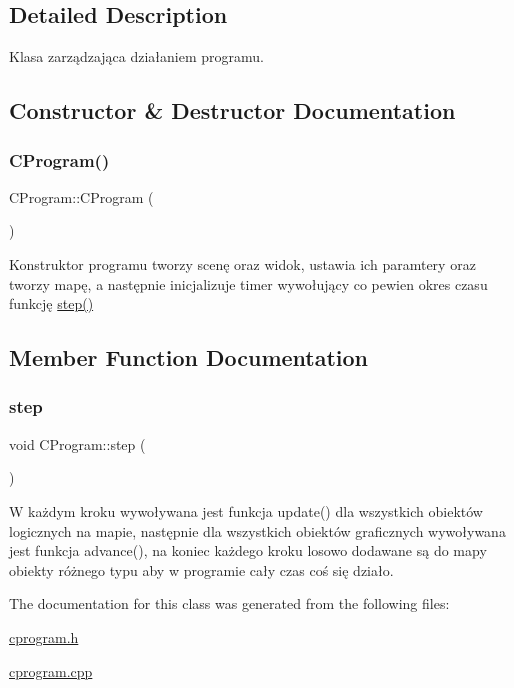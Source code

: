 \subsection{Detailed Description}
Klasa zarządzająca działaniem programu. 

\subsection{Constructor \& Destructor Documentation}
\mbox{\label{class_c_program_a74d3ca01d5e8b892f37684254ae546ed}} 
\subsubsection{\texorpdfstring{C\+Program()}{CProgram()}}
{\footnotesize\ttfamily C\+Program\+::\+C\+Program (\begin{DoxyParamCaption}{ }\end{DoxyParamCaption})}



Konstruktor programu tworzy scenę oraz widok, ustawia ich paramtery oraz tworzy mapę, a następnie inicjalizuje timer wywołujący co pewien okres czasu funkcję \mbox{\hyperlink{class_c_program_a643bd73f256632b72a7d6182e8e7d807}{step()}} 



\subsection{Member Function Documentation}
\mbox{\label{class_c_program_a643bd73f256632b72a7d6182e8e7d807}} 
\subsubsection{\texorpdfstring{step}{step}}
{\footnotesize\ttfamily void C\+Program\+::step (\begin{DoxyParamCaption}{ }\end{DoxyParamCaption})\hspace{0.3cm}{\ttfamily [slot]}}



W każdym kroku wywoływana jest funkcja update() dla wszystkich obiektów logicznych na mapie, następnie dla wszystkich obiektów graficznych wywoływana jest funkcja advance(), na koniec każdego kroku losowo dodawane są do mapy obiekty różnego typu aby w programie cały czas coś się działo. 



The documentation for this class was generated from the following files\+:\begin{DoxyCompactItemize}
\item 
\mbox{\hyperlink{cprogram_8h}{cprogram.\+h}}\item 
\mbox{\hyperlink{cprogram_8cpp}{cprogram.\+cpp}}\end{DoxyCompactItemize}
